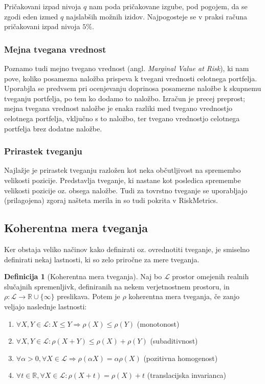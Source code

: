\documentclass[12pt,a4paper]{amsart}
\theoremstyle{definition} %
\newtheorem{definicija}{Definicija}[section]
\theoremstyle{plain} %
\begin{document}
Pričakovani izpad nivoja $q$ nam poda pričakovane izgube, pod 
pogojem, da se zgodi eden izmed $q$ najslabših možnih izidov. Najpogosteje se 
v praksi računa pričakovani izpad nivoja $5\%$. 

\subsubsection{Mejna tvegana vrednost}
Poznamo tudi mejno tvegano vrednost (angl. \textit{Marginal Value at Risk}), ki
nam pove, koliko posamezna naložba prispeva k tvegani vrednosti celotnega portfelja.
Uporabjla se predvsem pri ocenjevanju doprinosa posamezne naložbe k skupnemu
tveganju portfelja, po tem ko dodamo to naložbo. Izračun je precej preprost; mejna
tvegana vrednost naložbe je enaka razliki med tvegano vrednostjo celotnega 
portfelja, vključno s to naložbo, ter tvegano vrednostjo celotnega portfelja brez
dodatne naložbe.

\subsubsection{Prirastek tveganju}
Najlažje je prirastek tveganju razložen kot neka občutljivost na spremembo velikosti pozicije.
Predstavlja tveganje, ki nastane kot posledica spremembe velikosti pozicije oz. 
obsega naložbe. Tudi za tovrstno tveganje se uporabljajo (prilagojena)
zgoraj našteta merila in so tudi pokrita v RiskMetrics. 


\subsection{Koherentna mera tveganja}
Ker obstaja veliko načinov kako definirati oz. ovrednotiti tveganje, je smiselno 
definirati nekaj lastnosti, ki so zelo priročne za mere tveganja. 
\begin{definicija}[Koherentna mera tveganja]
	Naj bo $\mathcal{L}$ prostor omejenih realnih slučajnih spremenljivk,
	definiranih na nekem verjetnostnem prostoru, in $\rho: \mathcal{L} \to 
	\mathbb{R} \cup \{\infty\}$ preslikava. Potem je $\rho$ koherentna mera
	tveganja, če zanjo veljajo naslednje lastnosti:
	\begin{enumerate}
		\item $\forall X,Y \in \mathcal{L}: X \leq Y \Rightarrow \rho(X) \leq \rho(Y)$ (monotonost)
		\item $\forall X,Y \in \mathcal{L}: \rho(X+ Y) \leq \rho(X) + \rho(Y)$ (subaditivnost)
		\item $\forall \alpha > 0, \forall X \in \mathcal{L} \Rightarrow \rho(\alpha X) = \alpha \rho(X)$ (pozitivna homogenost)
		\item $\forall t \in \mathbb{R}, \forall X \in \mathcal{L}: \rho(X + t) = \rho(X) + t$ (translacijska invarianca)
	\end{enumerate}
\end{definicija}
\end{document}

